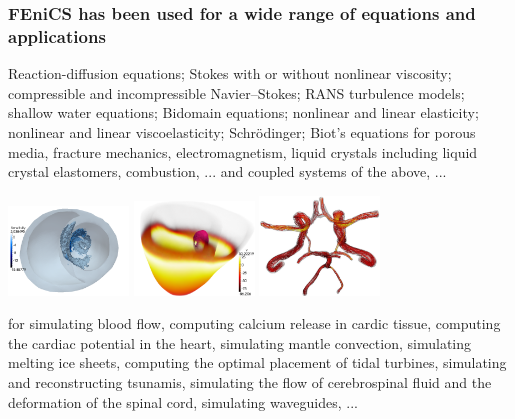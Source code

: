 \begin{frame}
\frametitle{FEniCS has been used for a wide range of
  equations and applications}

{\tiny Reaction-diffusion equations; Stokes with or without nonlinear
  viscosity; compressible and incompressible Navier--Stokes; RANS
  turbulence models; shallow water equations; Bidomain equations;
  nonlinear and linear elasticity; nonlinear and linear
  viscoelasticity; Schr\"odinger; Biot's equations for porous media,
  fracture mechanics, electromagnetism, liquid crystals including
  liquid crystal elastomers, combustion, ... and coupled systems of
  the above, ...}

\begin{center}
\includegraphics[width=0.24\textwidth]{png/g_el_plusx.png}
\includegraphics[width=0.24\textwidth]{png/unhealthy_v_at_T200.png}
\includegraphics[width=0.24\textwidth]{png/circle_of_willis_simulation.png}
\end{center}

{\tiny for simulating blood flow, computing calcium release in cardic
  tissue, computing the cardiac potential in the heart, simulating
  mantle convection, simulating melting ice sheets, computing the
  optimal placement of tidal turbines, simulating and reconstructing
  tsunamis, simulating the flow of cerebrospinal fluid and the
  deformation of the spinal cord, simulating waveguides, ... }

\end{frame}
